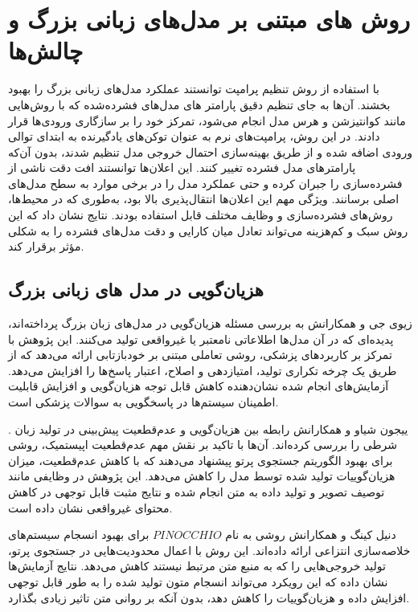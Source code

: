 \section{روش های مبتنی بر مدل‌های زبانی بزرگ و چالش‌ها}
 با استفاده از روش تنظیم پرامپت  توانستند عملکرد مدل‌های زبانی بزرگ را بهبود بخشند. آن‌ها به جای  تنظیم دقیق پارامتر های  مدل‌های فشرده‌شده  که با روش‌هایی مانند کوانتیزشن و هرس مدل  انجام می‌شود، تمرکز خود را بر سازگاری ورودی‌ها قرار دادند. در این روش، پرامپت‌های نرم
   به عنوان توکن‌های یادگیرنده به ابتدای توالی ورودی اضافه شده و از طریق بهینه‌سازی احتمال خروجی مدل تنظیم 
  شدند، بدون آن‌که پارامترهای مدل فشرده تغییر کنند. این اعلان‌ها توانستند افت دقت ناشی از فشرده‌سازی را جبران کرده و حتی عملکرد مدل را در برخی موارد به سطح مدل‌های اصلی برسانند. ویژگی مهم این اعلان‌ها انتقال‌پذیری بالا بود، به‌طوری که در محیط‌ها، روش‌های فشرده‌سازی و وظایف مختلف قابل استفاده بودند. نتایج نشان داد که این روش سبک و کم‌هزینه می‌تواند تعادل میان کارایی و دقت مدل‌های فشرده را به شکلی مؤثر برقرار کند\cite{Xu2024SoftPR}.
\subsection{هزیان‌گویی در مدل ‌های زبانی بزرگ}
 زیوی جی و همکارانش به بررسی مسئله هزیان‌گویی در مدل‌های زبان بزرگ پرداخته‌اند، پدیده‌ای که در آن مدل‌ها اطلاعاتی نامعتبر یا غیرواقعی تولید می‌کنند. این پژوهش با تمرکز بر کاربردهای پزشکی، روشی تعاملی مبتنی بر خودبازتابی ارائه می‌دهد که از طریق یک چرخه تکراری تولید، امتیازدهی و اصلاح، اعتبار پاسخ‌ها را افزایش می‌دهد. آزمایش‌های انجام شده نشان‌دهنده کاهش قابل توجه هزیان‌گویی و افزایش قابلیت اطمینان سیستم‌ها در پاسخگویی به سوالات پزشکی است\cite{ji-etal-2023-towards}​.

. ییجون شیاو و همکارانش رابطه بین هزیان‌گویی و عدم‌قطعیت پیش‌بینی در تولید زبان شرطی را بررسی کرده‌اند. آن‌ها با تاکید بر نقش مهم عدم‌قطعیت اپیستمیک، روشی برای بهبود الگوریتم جستجوی پرتو پیشنهاد می‌دهند که با کاهش عدم‌قطعیت، میزان هزیان‌گوییات تولید شده توسط مدل را کاهش می‌دهد. این پژوهش در وظایفی مانند توصیف تصویر و تولید داده به متن انجام شده و نتایج مثبت قابل توجهی در کاهش محتوای غیرواقعی نشان داده است\cite{xiao-wang-2021-hallucination}.

 دنیل کینگ و همکارانش روشی به نام $PINOCCHIO$ برای بهبود انسجام سیستم‌های خلاصه‌سازی انتزاعی ارائه داده‌اند. این روش با اعمال محدودیت‌هایی در جستجوی پرتو، تولید خروجی‌هایی را که به منبع متن مرتبط نیستند کاهش می‌دهد. نتایج آزمایش‌ها نشان داده که این رویکرد می‌تواند انسجام متون تولید شده را به طور قابل توجهی افزایش داده و هزیان‌گوییات را کاهش دهد، بدون آنکه بر روانی متن تاثیر زیادی بگذارد\cite{king-etal-2022-dont}​.


